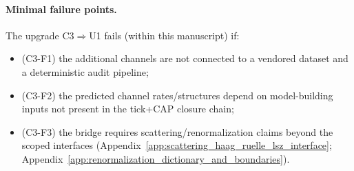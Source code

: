 \paragraph{Minimal failure points.}
\AuditTag The upgrade C3$\Rightarrow$U1 fails (within this manuscript) if:
\begin{itemize}
\item (C3-F1) the additional channels are not connected to a vendored dataset and a deterministic audit pipeline;
\item (C3-F2) the predicted channel rates/structures depend on model-building inputs not present in the tick+CAP closure chain;
\item (C3-F3) the bridge requires scattering/renormalization claims beyond the scoped interfaces (Appendix~\ref{app:scattering_haag_ruelle_lsz_interface}; Appendix~\ref{app:renormalization_dictionary_and_boundaries}).
\end{itemize}
